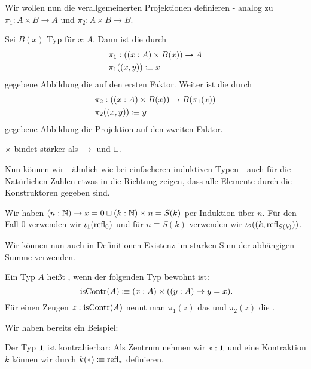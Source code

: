 Wir wollen nun die verallgemeinerten Projektionen definieren - analog zu $\pi_1:A\times B\to A$ und $\pi_2:A\times B\to B$.

\begin{definition}
  Sei $B(x)$ Typ für $x:A$.
  Dann ist die durch
  \begin{align*}
      &\pi_1:((x:A) \times B(x))\to A \\
      &\pi_1((x,y))\vcentcolon\mspace{-1.2mu}\equiv x
  \end{align*}
  gegebene Abbildung die  auf den ersten Faktor.
  Weiter ist die durch
  \begin{align*}
      &\pi_2:((x:A) \times B(x))\to B(\pi_1(x)) \\
      &\pi_2((x,y))\vcentcolon\mspace{-1.2mu}\equiv y
  \end{align*}
  gegebene Abbildung die Projektion auf den zweiten Faktor.
\end{definition}

\begin{konvention}
  $\times$ bindet stärker als $\to$ und $\sqcup$.
\end{konvention}

Nun können wir - ähnlich wie bei einfacheren induktiven Typen - auch für die Natürlichen Zahlen etwas in die Richtung zeigen, dass alle Elemente durch die Konstruktoren gegeben sind.

\begin{bemerkung}
  Wir haben $(n:\mathbb{N})\to x=0 \sqcup (k:\mathbb{N})\times n=S(k)$ per Induktion über $n$.
  Für den Fall $0$ verwenden wir $\iota_1(\mathrm{refl}_0)$ und für $n\equiv S(k)$ verwenden wir $\iota_2((k,\mathrm{refl}_{S(k)}))$.
\end{bemerkung}

Wir können nun auch in Definitionen Existenz im starken Sinn der abhängigen Summe verwenden.

\begin{definition}
  Ein Typ $A$ heißt \index{$\isContr$}, wenn der folgenden Typ bewohnt ist:
\[
  \mathrm{\isContr}(A)\colonequiv (x:A)\times ((y:A)\to y=x)\rlap{.}
\]
  Für einen Zeugen $z:\mathrm{isContr}(A)$ nennt man $\pi_1(z)$ das 
  und $\pi_2(z)$ die .
\end{definition}

Wir haben bereits ein Beispiel:
\begin{beispiel}
  Der Typ $\mathbf{1}$ ist kontrahierbar: Als Zentrum nehmen wir $\ast:\mathbf{1}$ und
  eine Kontraktion $k$ können wir durch $k(\ast)\vcentcolon\mspace{-1.2mu}\equiv \mathrm{refl}_\ast$ definieren.
\end{beispiel}


